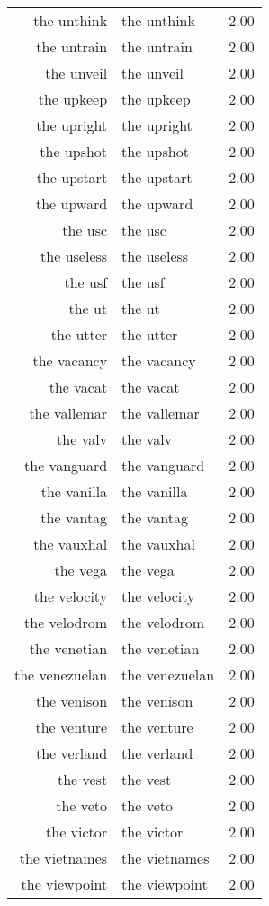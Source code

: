 \begin{table}[ht]
\begin{tabular}{rlr}
  the unthink & the unthink & 2.00 \\ 
  the untrain & the untrain & 2.00 \\ 
  the unveil & the unveil & 2.00 \\ 
  the upkeep & the upkeep & 2.00 \\ 
  the upright & the upright & 2.00 \\ 
  the upshot & the upshot & 2.00 \\ 
  the upstart & the upstart & 2.00 \\ 
  the upward & the upward & 2.00 \\ 
  the usc & the usc & 2.00 \\ 
  the useless & the useless & 2.00 \\ 
  the usf & the usf & 2.00 \\ 
  the ut & the ut & 2.00 \\ 
  the utter & the utter & 2.00 \\ 
  the vacancy & the vacancy & 2.00 \\ 
  the vacat & the vacat & 2.00 \\ 
  the vallemar & the vallemar & 2.00 \\ 
  the valv & the valv & 2.00 \\ 
  the vanguard & the vanguard & 2.00 \\ 
  the vanilla & the vanilla & 2.00 \\ 
  the vantag & the vantag & 2.00 \\ 
  the vauxhal & the vauxhal & 2.00 \\ 
  the vega & the vega & 2.00 \\ 
  the velocity & the velocity & 2.00 \\ 
  the velodrom & the velodrom & 2.00 \\ 
  the venetian & the venetian & 2.00 \\ 
  the venezuelan & the venezuelan & 2.00 \\ 
  the venison & the venison & 2.00 \\ 
  the venture & the venture & 2.00 \\ 
  the verland & the verland & 2.00 \\ 
  the vest & the vest & 2.00 \\ 
  the veto & the veto & 2.00 \\ 
  the victor & the victor & 2.00 \\ 
  the vietnames & the vietnames & 2.00 \\ 
  the viewpoint & the viewpoint & 2.00 \\ 

\end{tabular}
\end{table}
